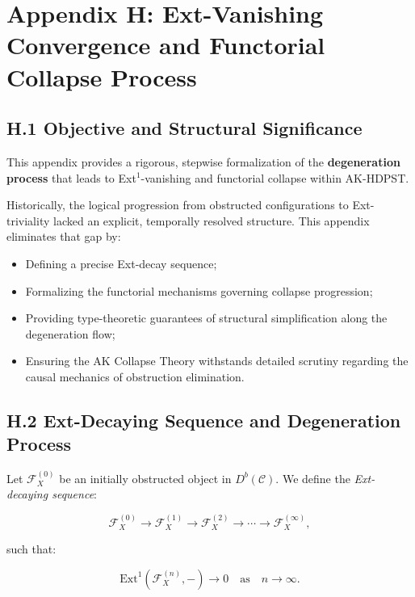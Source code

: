 \documentclass[11pt]{article}
\begin{document}
\section*{Appendix H: Ext-Vanishing Convergence and Functorial Collapse Process}

\subsection*{H.1 Objective and Structural Significance}

This appendix provides a rigorous, stepwise formalization of the \textbf{degeneration process} that leads to Ext$^1$-vanishing and functorial collapse within AK-HDPST.

Historically, the logical progression from obstructed configurations to Ext-triviality lacked an explicit, temporally resolved structure. This appendix eliminates that gap by:

\begin{itemize}
    \item Defining a precise Ext-decay sequence;
    \item Formalizing the functorial mechanisms governing collapse progression;
    \item Providing type-theoretic guarantees of structural simplification along the degeneration flow;
    \item Ensuring the AK Collapse Theory withstands detailed scrutiny regarding the causal mechanics of obstruction elimination.
\end{itemize}

\subsection*{H.2 Ext-Decaying Sequence and Degeneration Process}

Let \( \mathcal{F}_X^{(0)} \) be an initially obstructed object in \( D^b(\mathcal{C}) \). We define the \emph{Ext-decaying sequence}:

\[
\mathcal{F}_X^{(0)} \longrightarrow \mathcal{F}_X^{(1)} \longrightarrow \mathcal{F}_X^{(2)} \longrightarrow \cdots \longrightarrow \mathcal{F}_X^{(\infty)},
\]

such that:

\[
\mathrm{Ext}^1\left( \mathcal{F}_X^{(n)}, - \right) \to 0 \quad \text{as} \quad n \to \infty.
\]
\end{document}
